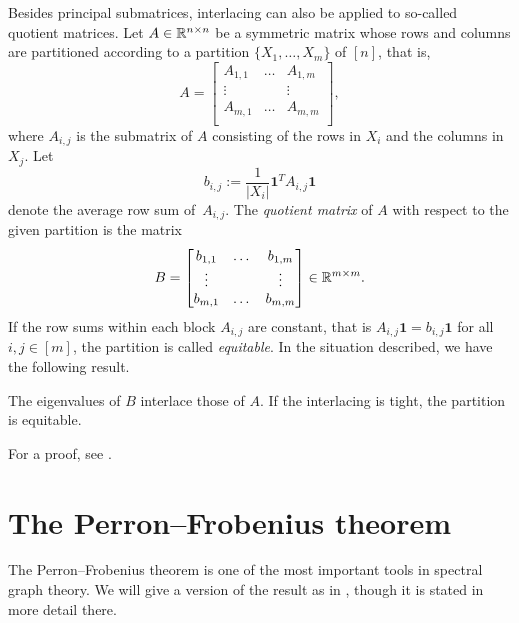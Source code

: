 Besides principal submatrices, interlacing can also be applied to so-called quotient matrices. 
Let $A \in \mathbb{R} ^{n \times n}$ be a symmetric matrix whose rows and columns are partitioned according to a partition $\{ X_1, \dots, X_m \}$ of $[n]$, that is, 
\begin{equation*}
    A = \begin{bmatrix}
        A_{1,1} & \dots & A_{1,m} \\
        \vdots & & \vdots \\
        A_{m,1} & \dots & A_{m,m} \\
    \end{bmatrix},
\end{equation*}
where $A_{i,j}$ is the submatrix of $A$ consisting of the rows in $X_i$ and the columns \mbox{in $X_j$}.
Let $$b_{i,j} := \frac{1}{|X_i|} \bm{1}^T A_{i,j}\bm{1}$$ denote the average row sum \mbox{of $A_{i,j}$}.
The \textit{quotient matrix} of $A$ with respect to the given partition is the matrix
\begin{equation*}
    B = \begin{bmatrix}
        b_{1,1} & \dots & b_{1,m} \\
        \vdots & & \vdots \\
        b_{m,1} & \dots & b_{m,m} \\
    \end{bmatrix} \in \mathbb{R}^{m \times m}.
\end{equation*}
If the row sums within each block $A_{i,j}$ are constant, that is $A_{i,j} \bm{1} = b_{i,j} \bm{1}$ for all $i,j \in [m]$, the partition is called \textit{equitable}. 
In the situation described, we have the following result.

\begin{proposition} \label{prop:partition-interlacing}
    The eigenvalues of $B$ interlace those of $A$. If the interlacing is tight, the partition is equitable.
\end{proposition}
For a proof, see \cite[Corollary 2.5.4]{brouwerhaemers}.

\section{The Perron--Frobenius theorem} \label{section:perron-frobenius}

The Perron--Frobenius theorem is one of the most important tools in spectral graph theory. 
We will give a version of the result as in \cite{brouwerhaemers}, though it is stated in more detail there.

